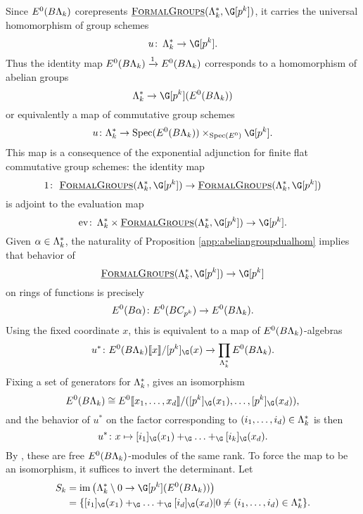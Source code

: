 Since $E^0(B\Lambda_k)$ corepresents $\InternalHom{FormalGroups}(\Lk^*,\G[p^k])$, it carries the universal homomorphism of group schemes
\[
u \co \Lk^* \rightarrow \G[p^k].
\]
Thus the identity map $E^0(B\Lambda_k) \xrightarrow{1} E^0(B\Lambda_k)$ corresponds to a homomorphism of abelian groups
\[
\Lk^* \rightarrow \G[p^k](E^0(B\Lk))
\]
or equivalently a map of commutative group schemes
\[
u \colon \Lk^* \rightarrow \Spec(E^0(B\Lk)) \times_{\Spec(E^0)} \G[p^k].
\]
This map is a consequence of the exponential adjunction for finite flat commutative group schemes: the identity map
\[
1 \co \InternalHom{FormalGroups}(\Lk^*,\G[p^k]) \to \InternalHom{FormalGroups}(\Lk^*,\G[p^k])
\]
is adjoint to the evaluation map
\[
\mathrm{ev} \co \Lk^* \times  \InternalHom{FormalGroups}(\Lk^*,\G[p^k]) \to \G[p^k].
\]
Given $\alpha \in \Lambda_k^*$, the naturality of Proposition \ref{app:abeliangroupdualhom} implies that behavior of
\[
\InternalHom{FormalGroups}(\Lk^*,\G[p^k]) \to \G[p^k]
\]
on rings of functions is precisely
\begin{equation} \label{app:gfunctions1}
E^0(B\alpha) \colon E^0(BC_{p^k}) \to E^0(B\Lambda_k).
\end{equation}
Using the fixed coordinate $x$, this is equivalent to a map of $E^0(B\Lambda_k)$-algebras
\begin{equation} \label{app:gfunctions2}
u^* \colon E^0(B\Lk)\ps{x}/[p^k]_{\G}(x) \xrightarrow{} \prod_{\Lk^*} E^0(B\Lk).
\end{equation}
Fixing a set of generators for $\Lambda_k^*$, gives an isomorphism
\[
E^0(B\Lk) \cong E^0\ps{x_1, \ldots, x_d}/([p^k]_{\G}(x_1), \ldots, [p^k]_{\G}(x_d)),
\]
and the behavior of $u^*$ on the factor corresponding to $(i_1, \ldots, i_d) \in \Lambda_k^*$ is then
\[
u^* \colon x \mapsto [i_1]_{\G}(x_1)+_{\G} \ldots +_{\G} [i_k]_{\G}(x_d).
\]
By , these are free $E^0(B\Lambda_k)$-modules of the same rank. To force the map to be an isomorphism, it suffices to invert the determinant. Let
\begin{align*}
S_k &= \im \big (\Lk^* \setminus 0 \rightarrow \G[p^k](E^0(B\Lk)) \big ) \\ &= \{ [i_1]_{\G}(x_1)+_{\G} \ldots +_{\G} [i_d]_{\G}(x_d)| 0 \neq (i_1, \ldots, i_d) \in \Lk^* \}.
\end{align*}

